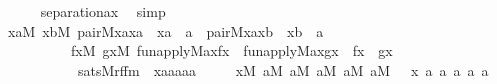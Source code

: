 \begin{isabellebody}
\ \ \ \ \isamarkupfalse%
\ separation{\isacharunderscore}{\kern0pt}ax\ \isamarkupfalse%
\ simp\isanewline
\ \ \isamarkupfalse%
\isanewline
\ \ \isamarkupfalse%
\ {\isachardoublequoteopen}{\isacharparenleft}{\kern0pt}{\isasymexists}xa{\isasymin}M{\isachardot}{\kern0pt}\ {\isasymexists}xb{\isasymin}M{\isachardot}{\kern0pt}\ pair{\isacharparenleft}{\kern0pt}{\isacharhash}{\kern0pt}{\isacharhash}{\kern0pt}M{\isacharcomma}{\kern0pt}x{\isacharcomma}{\kern0pt}a{}{\isacharcomma}{\kern0pt}xa{\isacharparenright}{\kern0pt}\ {\isacharampersand}{\kern0pt}\ xa\ {\isasymin}\ a{}\ {\isacharampersand}{\kern0pt}\ pair{\isacharparenleft}{\kern0pt}{\isacharhash}{\kern0pt}{\isacharhash}{\kern0pt}M{\isacharcomma}{\kern0pt}x{\isacharcomma}{\kern0pt}a{}{\isacharcomma}{\kern0pt}xb{\isacharparenright}{\kern0pt}\ {\isacharampersand}{\kern0pt}\ xb\ {\isasymin}\ a{}\ {\isacharampersand}{\kern0pt}\isanewline
\ \ \ \ \ \ \ \ \ \ {\isacharparenleft}{\kern0pt}{\isasymexists}fx{\isasymin}M{\isachardot}{\kern0pt}\ {\isasymexists}gx{\isasymin}M{\isachardot}{\kern0pt}\ fun{\isacharunderscore}{\kern0pt}apply{\isacharparenleft}{\kern0pt}{\isacharhash}{\kern0pt}{\isacharhash}{\kern0pt}M{\isacharcomma}{\kern0pt}a{}{\isacharcomma}{\kern0pt}x{\isacharcomma}{\kern0pt}fx{\isacharparenright}{\kern0pt}\ {\isacharampersand}{\kern0pt}\ fun{\isacharunderscore}{\kern0pt}apply{\isacharparenleft}{\kern0pt}{\isacharhash}{\kern0pt}{\isacharhash}{\kern0pt}M{\isacharcomma}{\kern0pt}a{}{\isacharcomma}{\kern0pt}x{\isacharcomma}{\kern0pt}gx{\isacharparenright}{\kern0pt}\ {\isacharampersand}{\kern0pt}\ fx\ {\isasymnoteq}\ gx{\isacharparenright}{\kern0pt}{\isacharparenright}{\kern0pt}\isanewline
\ \ \ \ \ \ \ \ \ \ {\isasymlongleftrightarrow}\ sats{\isacharparenleft}{\kern0pt}M{\isacharcomma}{\kern0pt}rffm{\isacharparenleft}{\kern0pt}{}{\isacharcomma}{\kern0pt}{}{\isacharcomma}{\kern0pt}{}{\isacharcomma}{\kern0pt}{}{\isacharcomma}{\kern0pt}{}{\isacharcomma}{\kern0pt}{}{\isacharparenright}{\kern0pt}\ {\isacharcomma}{\kern0pt}\ {\isacharbrackleft}{\kern0pt}x{\isacharcomma}{\kern0pt}a{}{\isacharcomma}{\kern0pt}a{}{\isacharcomma}{\kern0pt}a{}{\isacharcomma}{\kern0pt}a{}{\isacharcomma}{\kern0pt}a{}{\isacharbrackright}{\kern0pt}{\isacharparenright}{\kern0pt}{\isachardoublequoteclose}\isanewline
\ \ \ \ \ {\isachardoublequoteopen}x{\isasymin}M{\isachardoublequoteclose}\ {\isachardoublequoteopen}a{}{\isasymin}M{\isachardoublequoteclose}\ {\isachardoublequoteopen}a{}{\isasymin}M{\isachardoublequoteclose}\ {\isachardoublequoteopen}a{}{\isasymin}M{\isachardoublequoteclose}\ {\isachardoublequoteopen}a{}{\isasymin}M{\isachardoublequoteclose}\ {\isachardoublequoteopen}a{}{\isasymin}M{\isachardoublequoteclose}\ \ \ x\ a{}\ a{}\ a{}\ a{}\ a{}\isanewline

\end{isabellebody}
